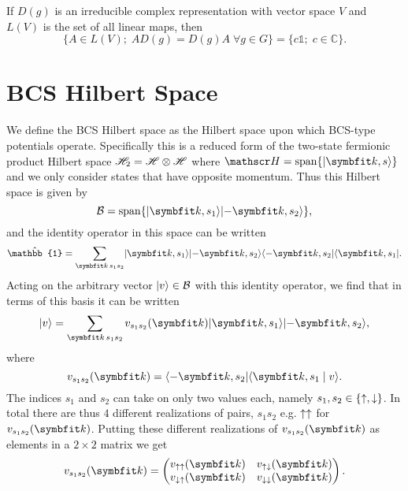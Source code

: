 \begin{thm}
    If $D(g)$ is an irreducible complex representation with vector space $V$ and $L(V)$ is the set of all linear maps, then
    \begin{equation}
        \label{eq:Group:Irr:ShursLemma}
        \{A\in L(V) ; \; AD(g) = D(g)A\;\forall g\in G\} = \{c\mathbb{1};\; c\in\mathbb{C}\}.
    \end{equation}
\end{thm}

\section{BCS Hilbert Space}
\label{sec:Group:BCSHil}
We define the BCS Hilbert space as the Hilbert space upon which BCS-type potentials operate. Specifically this is a reduced form of the two-state
fermionic product Hilbert space $\mathscr{H}_2 = \mathscr{H}\otimes\mathscr{H}$ where $\hil = \Span\{\ket{\v{k},s}\}$ and we only consider states that have opposite momentum.
Thus this Hilbert space is given by 
\begin{equation}
    \label{eq:Group:BCSHil:space}
    \mathcal{B} = \Span\{\ket{\v{k},s_1}\ket{-\v{k},s_2}\},
\end{equation}
and the identity operator in this space can be written
\begin{equation}
    \label{eq:Group:BCSHil:id}
    \hat{\mathbb{1}} = \sum_{\v{k}\,s_1s_2}\ket{\v{k},s_1}\ket{-\v{k},s_2}\bra{-\v{k},s_2}\bra{\v{k},s_1}.
\end{equation}
Acting on the arbitrary vector $\lvert v \rangle\in\mathcal{B}$ with this identity operator, we find that in terms of this basis it can be written
\begin{equation}
    \label{eq:Group:BCSHil:arbitrary}
    \ket{v} = \sum_{\v{k}\,s_1s_2}v_{s_1s_2}(\v{k})\ket{\v{k},s_1}\ket{-\v{k},s_2},
\end{equation}
where
\begin{equation}
    \label{eq:Group:BCSHil:arbitrary}
    v_{s_1s_2}(\v{k}) = \bra{-\v{k},s_2}\braket{\v{k},s_1}{v}.
\end{equation}
The indices $s_1$ and $s_2$ can take on only two values each, namely $s_1,s_2\in\{\uparrow,\downarrow\}$. In total there are thus $4$ different realizations
of pairs, $s_1s_2$ e.g. $\uparrow\uparrow$ for $v_{s_1s_2}(\v{k})$. Putting these different realizations of $v_{s_1s_2}(\v{k})$ as elements in a $2\times2$ matrix
we get
\begin{equation}
    \label{eq:Group:BCSHil:arb:mat}
    v_{s_1s_2}(\v{k}) =
    \begin{pmatrix}
        v_{\up\up}(\v{k}) & v_{\up\dn}(\v{k})\\
        v_{\dn\up}(\v{k}) & v_{\dn\dn}(\v{k})
    \end{pmatrix}.
\end{equation}
